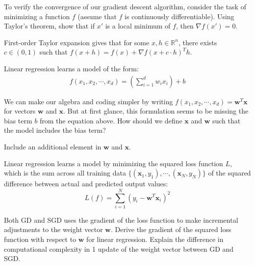 \begin{problem}[3]
    To verify the convergence of our gradient descent algorithm, consider the task of minimizing a function $f$ (assume that $f$ is continuously differentiable). Using Taylor's theorem, show that if $x'$ is a local minimum of $f$, then $\nabla f(x') = 0$. 
\end{problem}
\begin{hint}
  First-order Taylor expansion gives that for some $x, h \in \mathbb{R}^n$, there exists $c \in (0, 1)$ such that $f(x + h) = f(x) + \nabla f(x + c\cdot h)^T h$.
  
\end{hint}
\begin{solution}

\end{solution}

Linear regression learns a model of the form:
\begin{align*}
  f(x_1, x_2, \cdots, x_d) = \left(\sum_{i=1}^d w_i x_i\right) + b
\end{align*}

\begin{problem}[1]
  We can make our algebra and coding simpler by writing $f(x_1, x_2, \cdots, x_d) = \mathbf{w}^T\mathbf{x}$ for vectors $\mathbf{w}$ and $\mathbf{x}$.  But at first glance, this formulation seems to be missing the bias term $b$ from the equation above.  How should we define $\mathbf{x}$ and $\mathbf{w}$ such that the model includes the bias term?
\end{problem}
\begin{hint}
  Include an additional element in $\mathbf{w}$ and $\mathbf{x}$.
\end{hint}
\begin{solution}
  
\end{solution}

Linear regression learns a model by minimizing the squared loss function $L$, which is the sum across all training data $\{(\mathbf{x}_1, y_1),\cdots,(\mathbf{x}_N, y_N)\}$ of the squared difference between actual and predicted output values:
\[L(f) = \sum_{i=1}^N (y_i - \mathbf{w}^T\mathbf{x}_i)^2\]

\begin{problem}[2]
  Both GD and SGD uses the gradient of the loss function to make incremental adjustments to the weight vector $\mathbf{w}$. Derive the gradient of the squared loss function with respect to $\mathbf{w}$ for linear regression. Explain the difference in computational complexity in 1 update of the weight vector between GD and SGD. 
\end{problem}
\begin{solution}
  
\end{solution}

